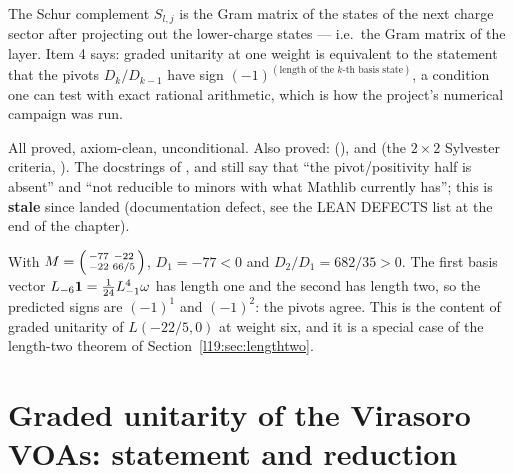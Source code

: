 \begin{physics}
The Schur complement $S_{l,j}$ is the Gram matrix of the states of the next charge sector after
projecting out the lower-charge states --- i.e.\ the Gram matrix of the layer. Item 4 says: graded
unitarity at one weight is equivalent to the statement that the pivots
$D_k/D_{k-1}$ have sign $(-1)^{(\text{length of the }k\text{-th basis state})}$, a condition one can
test with exact rational arithmetic, which is how the project's numerical campaign was run.
\end{physics}

\begin{status}
All proved, axiom-clean, unconditional. Also proved: \allowbreak{}\allowbreak{}\allowbreak{}
(), \allowbreak{}\allowbreak{} and
\allowbreak{}\allowbreak{} (the $2\times2$ Sylvester criteria,
). The docstrings of ,
 and  still say that ``the
pivot/positivity half is absent'' and ``not reducible to minors with what Mathlib currently has'';
this is \textbf{stale} since  landed (documentation defect, see the LEAN
DEFECTS list at the end of the chapter).
\end{status}

\begin{example}\label{l19:ex:ly6}
With $M = \begin{psmallmatrix}-77&-22\\-22&66/5\end{psmallmatrix}$, $D_1 = -77<0$ and
$D_2/D_1 = 682/35>0$. The first basis vector $L_{-6}\mathbf{1} = \tfrac1{24}L_{-1}^4\omega$ has length
one and the second has length two, so the predicted signs are $(-1)^1$ and $(-1)^2$: the
pivots agree. This is the content of graded unitarity of $L(-22/5,0)$ at weight six, and it is a
special case of the length-two theorem of Section~\ref{l19:sec:lengthtwo}.
\end{example}

\section{Graded unitarity of the Virasoro VOAs: statement and reduction}\label{l19:sec:vir}


